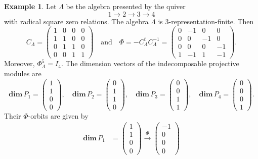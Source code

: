 \documentclass[11pt,a4paper]{amsart}
\theoremstyle{definition}
\newtheorem{example}[theorem]{Example}
\numberwithin{equation}{section}
\newcommand{\0}{\mathbf{0}}
\newcommand{\dimv}{\mathbf{dim}\,}
\begin{document}
	\begin{example}
		Let $\Lambda$ be the algebra presented by the  quiver 
		\[		
		1\longrightarrow2\longrightarrow3\longrightarrow4
		\] with radical square zero relations. The algebra $\Lambda$ is $3$-representation-finite.
		 Then
		\[
		C_\Lambda=
		\begin{pmatrix}
			1&0&0&0\\
			1&1&0&0\\
			0&1&1&0\\
			0&0&1&1
		\end{pmatrix}
		\quad\text{and}\quad
		\Phi
		=
		-C_\Lambda^tC_\Lambda^{-1}
		=
		\begin{pmatrix}
			0&-1&0&0\\
			0&0&-1&0\\
			0&0&0&-1\\
			1&-1&1&-1
		\end{pmatrix}.
		\]
		Moreover, $\Phi_\Lambda^5=I_4$. The dimension vectors of the
		indecomposable projective modules are
		\[
		\dimv P_1=
		\begin{pmatrix}1\\1\\0\\0\end{pmatrix},\quad
		\dimv P_2=
		\begin{pmatrix}0\\1\\1\\0\end{pmatrix},\quad
		\dimv P_3=
		\begin{pmatrix}0\\0\\1\\1\end{pmatrix},\quad
		\dimv P_4=
		\begin{pmatrix}0\\0\\0\\1\end{pmatrix}.
		\] 	
		Their $\Phi$-orbits are given by
		\[
		\begin{aligned}
			\dimv P_1
			&=
			\begin{pmatrix}1\\1\\0\\0\end{pmatrix}
			\xrightarrow{\Phi}
			\begin{pmatrix}-1\\0\\0\\0\end{pmatrix}

\end{aligned}\]
\end{example}
\end{document}
